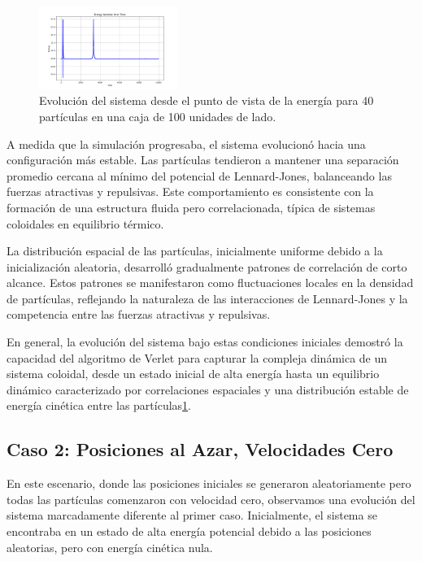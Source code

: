 \documentclass[twocolumn]{article}
\begin{document}
\begin{figure}[h]
    \centering
    \includegraphics[width=0.4\textwidth]{figures/variacion_energia_40p_10ki_11.png}
    \caption{Evolución del sistema desde el punto de vista de la energía para 40 partículas en una caja de 100 unidades de lado.}
    \label{fig:case1_energia}
\end{figure}

A medida que la simulación progresaba, el sistema evolucionó hacia una configuración más estable. Las partículas tendieron a mantener una separación promedio cercana al mínimo del potencial de Lennard-Jones, balanceando las fuerzas atractivas y repulsivas. Este comportamiento es consistente con la formación de una estructura fluida pero correlacionada, típica de sistemas coloidales en equilibrio térmico.

La distribución espacial de las partículas, inicialmente uniforme debido a la inicialización aleatoria, desarrolló gradualmente patrones de correlación de corto alcance. Estos patrones se manifestaron como fluctuaciones locales en la densidad de partículas, reflejando la naturaleza de las interacciones de Lennard-Jones y la competencia entre las fuerzas atractivas y repulsivas.

En general, la evolución del sistema bajo estas condiciones iniciales demostró la capacidad del algoritmo de Verlet para capturar la compleja dinámica de un sistema coloidal, desde un estado inicial de alta energía hasta un equilibrio dinámico caracterizado por correlaciones espaciales y una distribución estable de energía cinética entre las partículas\ref{fig:case1_energia}.

\subsection*{Caso 2: Posiciones al Azar, Velocidades Cero}

En este escenario, donde las posiciones iniciales se generaron aleatoriamente pero todas las partículas comenzaron con velocidad cero, observamos una evolución del sistema marcadamente diferente al primer caso. Inicialmente, el sistema se encontraba en un estado de alta energía potencial debido a las posiciones aleatorias, pero con energía cinética nula.
\end{document}
